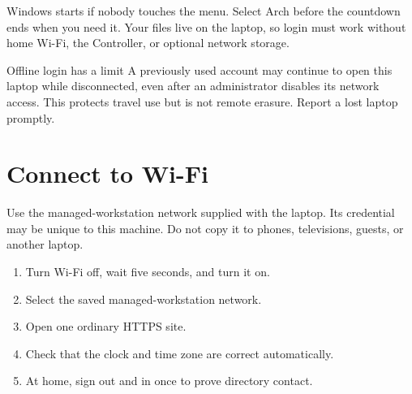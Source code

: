Windows starts if nobody touches the menu. Select Arch before the countdown
ends when you need it. Your files live on the laptop, so login must work
without home Wi-Fi, the Controller, or optional network storage.


\begin{gate}{Offline login has a limit}
A previously used account may continue to open this laptop while disconnected,
even after an administrator disables its network access. This protects travel
use but is not remote erasure. Report a lost laptop promptly.
\end{gate}

\section{Connect to Wi-Fi}

Use the managed-workstation network supplied with the laptop. Its credential
may be unique to this machine. Do not copy it to phones, televisions, guests,
or another laptop.

\begin{enumerate}
\item Turn Wi-Fi off, wait five seconds, and turn it on.
\item Select the saved managed-workstation network.
\item Open one ordinary HTTPS site.
\item Check that the clock and time zone are correct automatically.
\item At home, sign out and in once to prove directory contact.
\end{enumerate}


